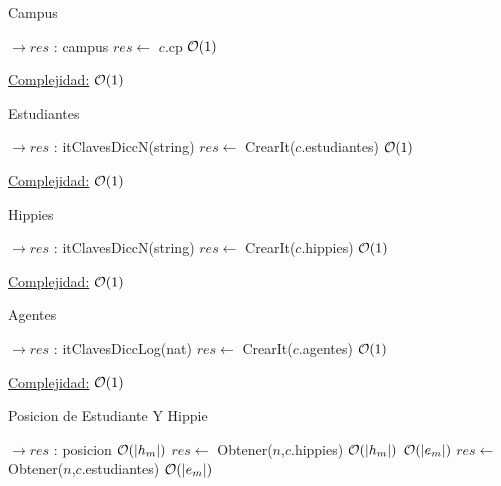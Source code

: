 \newpage
\begin{Algoritmos}

\begin{algorithm}[H]
\caption{Campus}

\begin{algorithmic}[1]
  $\to res$ : campus
  \State $res \gets$ $c$.cp \Comment $\mathcal{O}(1)$
 \EndProcedure
\end{algorithmic}

 \underline{Complejidad:} $\mathcal{O}(1)$
\end{algorithm}


\begin{algorithm}[H]
\caption{Estudiantes}

\begin{algorithmic}[1]
  $\to res$ : itClavesDiccN(string)
  \State $res \gets$ CrearIt($c$.estudiantes) \Comment $\mathcal{O}(1)$
 \EndProcedure
\end{algorithmic}
 \underline{Complejidad:} $\mathcal{O}(1)$
\end{algorithm}


\begin{algorithm}[H]
\caption{Hippies}
\begin{algorithmic}[1]
	 $\to res$ : itClavesDiccN(string)
	\State $res \gets$ CrearIt($c$.hippies) \Comment $\mathcal{O}(1)$
	\EndProcedure
\end{algorithmic}
\underline{Complejidad:} $\mathcal{O}(1)$
\end{algorithm}


\begin{algorithm}[H]
\caption{Agentes}
\begin{algorithmic}[1]
	 $\to res$ : itClavesDiccLog(nat)
	\State $res \gets$ CrearIt($c$.agentes) \Comment $\mathcal{O}(1)$
	\EndProcedure
\end{algorithmic}
\underline{Complejidad:} $\mathcal{O}(1)$
\end{algorithm}



\begin{algorithm}[H]
\caption{Posicion de Estudiante Y Hippie}

\begin{algorithmic}[1]
 $\to res$ : posicion
	 \Comment $\mathcal{O}(|h_m|)$
		\State $res \gets$ Obtener($n$,$c$.hippies) \Comment $\mathcal{O}(|h_m|)$
	\Else
		 \Comment $\mathcal{O}(|e_m|)$
			\State $res \gets$ Obtener($n$,$c$.estudiantes) \Comment $\mathcal{O}(|e_m|)$
		\EndIf
	\EndIf	
 \EndProcedure
\end{algorithmic}


\end{algorithm}
\end{Algoritmos}
